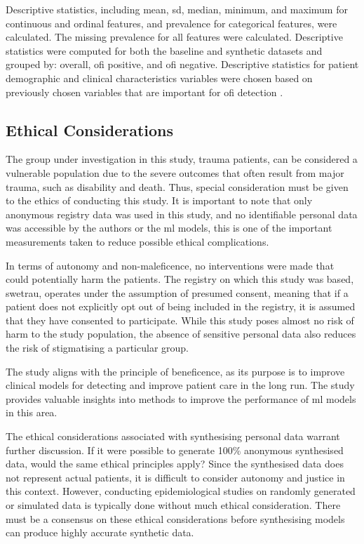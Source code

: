 \documentclass[12pt, a4paper]{article}
\begin{document}
Descriptive statistics, including mean, \acrfull{sd}, median, minimum, and maximum for continuous and ordinal features, and prevalence for categorical features, were calculated. The missing prevalence for all features were calculated. Descriptive statistics were computed for both the baseline and synthetic datasets and grouped by: overall, \acrshort{ofi} positive, and \acrshort{ofi} negative. Descriptive statistics for patient demographic and clinical characteristics variables were chosen based on previously chosen variables that are important for \acrshort{ofi} detection \cite{attergrim_predicting_2023}.

\subsection{Ethical Considerations}
The group under investigation in this study, trauma patients, can be considered a vulnerable population due to the severe outcomes that often result from major trauma, such as disability and death. Thus, special consideration must be given to the ethics of conducting this study. It is important to note that only anonymous registry data was used in this study, and no identifiable personal data was accessible by the authors or the \acrshort{ml} models, this is one of the important measurements taken to reduce possible ethical complications.

In terms of autonomy and non-maleficence, no interventions were made that could potentially harm the patients. The registry on which this study was based, \acrshort{swetrau}, operates under the assumption of presumed consent, meaning that if a patient does not explicitly opt out of being included in the registry, it is assumed that they have consented to participate. While this study poses almost no risk of harm to the study population, the absence of sensitive personal data also reduces the risk of stigmatising a particular group.

The study aligns with the principle of beneficence, as its purpose is to improve clinical models for detecting  and improve patient care in the long run. The study provides valuable insights into methods to improve the performance of \acrshort{ml} models in this area.

The ethical considerations associated with synthesising personal data warrant further discussion. If it were possible to generate 100\% anonymous synthesised data, would the same ethical principles apply? Since the synthesised data does not represent actual patients, it is difficult to consider autonomy and justice in this context. However, conducting epidemiological studies on randomly generated or simulated data is typically done without much ethical consideration. There must be a consensus on these ethical considerations before synthesising models can produce highly accurate synthetic data.
\end{document}
